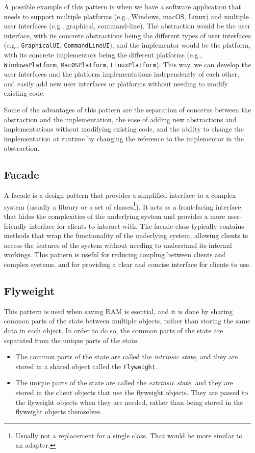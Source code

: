 A possible example of this pattern is when we have a software application that needs to support multiple platforms (e.g., Windows, macOS, Linux) and multiple user interfaces (e.g., graphical, command-line). The abstraction would be the user interface, with its concrete abstractions being the different types of user interfaces (e.g., \texttt{GraphicalUI}, \texttt{CommandLineUI}), and the implementor would be the platform, with its concrete implementors being the different platforms (e.g., \texttt{WindowsPlatform}, \texttt{MacOSPlatform}, \texttt{LinuxPlatform}). This way, we can develop the user interfaces and the platform implementations independently of each other, and easily add new user interfaces or platforms without needing to modify existing code.

Some of the advantages of this pattern are the separation of concerns between the abstraction and the implementation, the ease of adding new abstractions and implementations without modifying existing code, and the ability to change the implementation at runtime by changing the reference to the implementor in the abstraction.


\subsection{Facade}

A facade is a design pattern that provides a simplified interface to a complex system (usually a library or a set of classes\footnote{Usually not a replacement for a single class. That would be more similar to an adapter.}). It acts as a front-facing interface that hides the complexities of the underlying system and provides a more user-friendly interface for clients to interact with. The facade class typically contains methods that wrap the functionality of the underlying system, allowing clients to access the features of the system without needing to understand its internal workings. This pattern is useful for reducing coupling between clients and complex systems, and for providing a clear and concise interface for clients to use.



\subsection{Flyweight}

This pattern is used when saving RAM is esential, and it is done by sharing common parts of the state between multiple objects, rather than storing the same data in each object. In order to do so, the common parts of the state are separated from the unique parts of the state:
\begin{itemize}
    \item The common parts of the state are called the \emph{intrinsic state}, and they are stored in a shared object called the \texttt{Flyweight}.
    \item The unique parts of the state are called the \emph{extrinsic state}, and they are stored in the client objects that use the flyweight objects. They are passed to the flyweight objects when they are needed, rather than being stored in the flyweight objects themselves.
\end{itemize}

